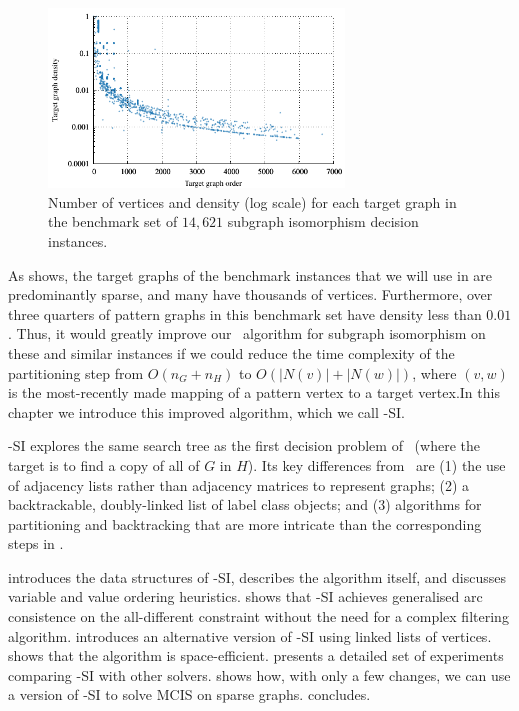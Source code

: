 \begin{figure}[htb]
    \centering
    \includegraphics*[width=0.7\textwidth]{14b-mcsplit-induced-si/density-chart/plots/n-density-pdf}
    \caption{Number of vertices and density (log scale) for each target graph in the benchmark set
    of $14,621$ subgraph isomorphism decision instances.}
    \label{figure:si-targets-n-density}
\end{figure}

As  shows, the target graphs of the benchmark
instances that we will use in  are
predominantly sparse, and many have thousands of vertices.  Furthermore, over three
quarters of pattern graphs in this benchmark set have density less than $0.01$.
Thus, it would greatly improve our \McSplit\ algorithm for subgraph isomorphism
on these and similar instances if we could reduce the time complexity of the
partitioning step from $O(n_G + n_H)$ to $O(|N(v)| + |N(w)|)$, where $(v,w)$ is
the most-recently made mapping of a pattern vertex to a target vertex.In this
chapter we introduce this improved algorithm, which we call \McSplit-SI.

\McSplit-SI explores the same search tree as the first decision problem of
\McSplitDown\ (where the target is to find a copy of all of $G$ in $H$).
Its key differences from
\McSplit\ are (1) the use of adjacency lists rather than adjacency matrices
to represent graphs; (2) a backtrackable, doubly-linked list of label class objects;
and (3) algorithms for partitioning and backtracking that are more intricate
than the corresponding steps in \McSplit.

 introduces the data structures of \McSplit-SI,
 describes the algorithm itself, and
 discusses variable and value ordering heuristics.
 shows that \McSplit-SI achieves generalised arc consistence
on the all-different constraint without the need for a complex filtering algorithm.
 introduces an alternative version of \McSplit-SI
using linked lists of vertices.
 shows that the algorithm is space-efficient.
 presents a detailed set of experiments comparing
\McSplit-SI with other solvers.
 shows how, with only a few changes, we can use a version
of \McSplit-SI to solve MCIS on sparse graphs.
 concludes.

